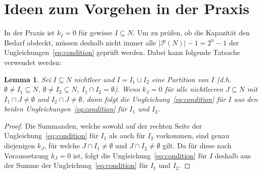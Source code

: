 \documentclass{article}
\newtheorem{lemma}{Lemma}
\newcommand{\powerset}{\ensuremath{\mathcal{P}}}
\begin{document}
	\section{Ideen zum Vorgehen in der Praxis}
	In der Praxis ist $k_I = 0$ für gewisse  $I\subseteq N$. Um zu prüfen, ob die Kapazität den Bedarf abdeckt, müssen deshalb nicht immer alle $\left|\powerset(N)\right| - 1 =  2^n - 1$ der Ungleichungen~\ref{eq:condition} geprüft werden. Dabei kann folgende Tatsache verwendet werden:
	\begin{lemma}
		\label{lemma:lemma_partitionen}
		Sei $I\subseteq N$ nichtleer und $I = I_1 \cup I_2$ eine Partition von $I$ (d.h. $\emptyset\neq I_1\subseteq N$, $\emptyset\neq I_2\subseteq N$, $I_1 \cap I_2 = \emptyset$).
		Wenn $k_J=0$ für alle nichtleeren $J\subseteq N$ mit $I_1 \cap J\neq \emptyset$ und $I_2 \cap J\neq \emptyset$, dann folgt die Ungleichung~\ref{eq:condition} für $I$ aus den beiden Ungleichungen~\ref{eq:condition} für $I_1$ und $I_2$.
	\end{lemma}
	\begin{proof}
		Die Summanden, welche sowohl auf der rechten Seite der Ungleichung~\ref{eq:condition} für $I_1$ als auch für $I_2$ vorkommen, sind genau diejenigen $k_J$, für welche $J\cap I_1\neq \emptyset$ und $J\cap I_2\neq \emptyset$ gilt. Da für diese nach Voraussetzung $k_J=0$ ist, folgt die Ungleichung~\ref{eq:condition} für $I$ deshalb aus der Summe der Ungleichung~\ref{eq:condition} für $I_1$ und $I_2$.
	\end{proof}

	
	
\end{document}
